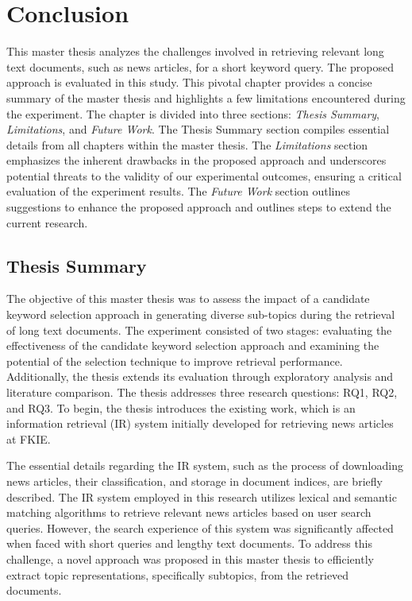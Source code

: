 
\chapter{Conclusion}

This master thesis analyzes the challenges involved in retrieving relevant long text documents, such as news articles, for a short keyword query. The proposed approach is evaluated in this study. This pivotal chapter provides a concise summary of the master thesis and highlights a few limitations encountered during the experiment. The chapter is divided into three sections: \textit{Thesis Summary}, \textit{Limitations}, and \textit{Future Work}. The Thesis Summary section compiles essential details from all chapters within the master thesis. The \textit{Limitations} section emphasizes the inherent drawbacks in the proposed approach and underscores potential threats to the validity of our experimental outcomes, ensuring a critical evaluation of the experiment results. The \textit{Future Work} section outlines suggestions to enhance the proposed approach and outlines steps to extend the current research.

\section{Thesis Summary}

The objective of this master thesis was to assess the impact of a candidate keyword selection approach in generating diverse sub-topics during the retrieval of long text documents. The experiment consisted of two stages: evaluating the effectiveness of the candidate keyword selection approach and examining the potential of the selection technique to improve retrieval performance. Additionally, the thesis extends its evaluation through exploratory analysis and literature comparison. The thesis addresses three research questions: RQ1, RQ2, and RQ3. To begin, the thesis introduces the existing work, which is an information retrieval (IR) system initially developed for retrieving news articles at \ac{FKIE}. 

The essential details regarding the \ac{IR} system, such as the process of downloading news articles, their classification, and storage in document indices, are briefly described. The \ac{IR} system employed in this research utilizes lexical and semantic matching algorithms to retrieve relevant news articles based on user search queries. However, the search experience of this system was significantly affected when faced with short queries and lengthy text documents. To address this challenge, a novel approach was proposed in this master thesis to efficiently extract topic representations, specifically subtopics, from the retrieved documents.

